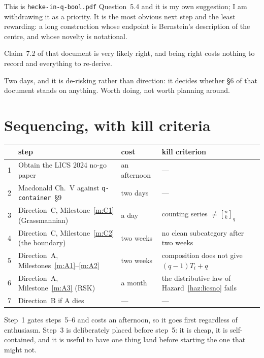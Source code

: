 \documentclass[11pt,a4paper]{article}
\theoremstyle{definition}
\theoremstyle{remark}
\newcommand{\HQB}{\texttt{hecke-\allowbreak{}in-\allowbreak{}q-\allowbreak{}bool.pdf}}
\newcommand{\qbin}[2]{\genfrac{[}{]}{0pt}{}{#1}{#2}_{q}}
\newcommand{\STOP}{\textcolor{nored}{\textbf{don't}}}
\newcommand{\WAIT}{\textcolor{openblue}{\textbf{gated}}}
\begin{document}
\begin{description}[leftmargin=1.6em,style=nextline,nosep]
\item[\STOP{} Build the affine flag container.] This is
\HQB{} Question~5.4 and it is my own suggestion; I am
withdrawing it as a priority. It is the most obvious next step and the least
rewarding: a long construction whose endpoint is Bernstein's description of the
centre, and whose novelty is notational.
\item[\STOP{} Chase Macdonald's second parameter as a construction.] Claim~7.2
of that document is very likely right, and being right costs nothing to record
and everything to re-derive.
\item[\WAIT{} Read Macdonald Chapter~V.] Two days, and it is de-risking rather
than direction: it decides whether \S6 of that document stands on anything.
Worth doing, not worth planning around.
\end{description}

\section{Sequencing, with kill criteria}\label{sec:seq}

\begin{center}
\small
\setlength{\tabcolsep}{4pt}
\begin{tabular}{@{}rlll@{}}
\toprule
& step & cost & kill criterion \\
\midrule
1 & Obtain the LICS 2024 no-go paper & an afternoon & --- \\
2 & Macdonald Ch.~V against \texttt{q-container}~\S9 & two days & --- \\
3 & Direction~C, Milestone~\ref{m:C1} (Grassmannian) & a day
  & counting series $\ne \qbin{n}{k}$ \\
4 & Direction~C, Milestone~\ref{m:C2} (the boundary) & two weeks
  & no clean subcategory after two weeks \\
5 & Direction~A, Milestones~\ref{m:A1}--\ref{m:A2} & two weeks
  & composition does not give $(q-1)T_i + q$ \\
6 & Direction~A, Milestone~\ref{m:A3} (RSK) & a month
  & the distributive law of Hazard~\ref{haz:licsno} fails \\
7 & Direction~B if A dies & --- & --- \\
\bottomrule
\end{tabular}
\end{center}

Step~1 gates steps~5--6 and costs an afternoon, so it goes first regardless of
enthusiasm. Step~3 is deliberately placed before step~5: it is cheap, it is
self-contained, and it is useful to have one thing land before starting the one
that might not.
\end{document}
